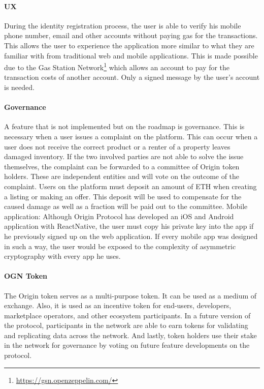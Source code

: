 \paragraph{UX}
During the identity registration process, the user is able to verify his mobile phone number, email and other accounts without paying gas for the transactions. This allows the user to experience the application more similar to what they are familiar with from traditional web and mobile applications. This is made possible due to the Gas Station Network\footnote{\url{https://gsn.openzeppelin.com/}} which allows an account to pay for the transaction costs of another account. Only a signed message by the user's account is needed. 

\paragraph{Governance}
A feature that is not implemented but on the roadmap is governance. This is necessary when a user issues a complaint on the platform. This can occur when a user does not receive the correct product or a renter of a property leaves damaged inventory. If the two involved parties are not able to solve the issue themselves, the complaint can be forwarded to a committee of Origin token holders. These are independent entities and will vote on the outcome of the complaint. Users on the platform must deposit an amount of ETH when creating a listing or making an offer. This deposit will be used to compensate for the caused damage as well as a fraction will be paid out to the committee.
Mobile application: Although Origin Protocol has developed an iOS and Android application with ReactNative, the user must copy his private key into the app if he previously signed up on the web application. If every mobile app was designed in such a way, the user would be exposed to the complexity of asymmetric cryptography with every app he uses.

\paragraph{OGN Token} The Origin token serves as a multi-purpose token. It can be used as a medium of exchange. Also, it is used as an incentive token for end-users, developers, marketplace operators, and other ecosystem participants. In a future version of the protocol, participants in the network are able to earn tokens for validating and replicating data across the network. And lastly, token holders use their stake in the network for governance by voting on future feature developments on the protocol. 

